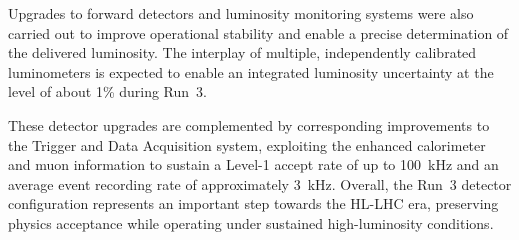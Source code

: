 Upgrades to forward detectors and luminosity monitoring systems were also carried out to improve operational stability and enable a precise determination of the delivered luminosity.
The interplay of multiple, independently calibrated luminometers is expected to enable an integrated luminosity uncertainty at the level of about 1\% during Run~3.

These detector upgrades are complemented by corresponding improvements to the Trigger and Data Acquisition system, exploiting the enhanced calorimeter and muon information to sustain a Level-1 accept rate of up to 100~kHz and an average event recording rate of approximately 3~kHz.
Overall, the Run~3 detector configuration represents an important step towards the HL-LHC era, preserving physics acceptance while operating under sustained high-luminosity conditions.
